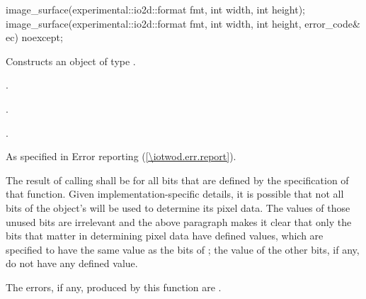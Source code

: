\begin{itemdecl}
image_surface(experimental::io2d::format fmt, int width, int height);
image_surface(experimental::io2d::format fmt, int width, int height, 
  error_code& ec) noexcept;
\end{itemdecl}
\begin{itemdescr}
\pnum
\effects
Constructs an object of type .

\pnum
\postconditions
{}.

\pnum
{}.

\pnum
{}.

\pnum
\throws
As specified in Error reporting (\ref{\iotwod.err.report}).

\pnum
\remarks
The result of calling  shall be  for all bits that are defined by the specification of that function.
\enternote
Given implementation-specific details, it is possible that not all bits of the  object's \underlyingimagesurface will be used to determine its pixel data. The values of those unused bits are irrelevant and the above paragraph makes it clear that only the bits that matter in determining pixel data have defined values, which are specified to have the same value as the bits of ; the value of the other bits, if any, do not have any defined value.
\exitnote

\pnum
\errors
The errors, if any, produced by this function are .
\end{itemdescr}

